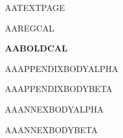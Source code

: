 \documentclass{abntexto-ufc}
\begin{document}
\textual
\setcounter{page}{70}

\noindent AATEXTPAGE\par
\noindent AAREGCAL\par
\noindent\textbf{AABOLDCAL}\par

\noindent AAAPPENDIXBODYALPHA\par

\noindent AAAPPENDIXBODYBETA\par

\noindent AAANNEXBODYALPHA\par

\noindent AAANNEXBODYBETA\par
\end{document}
